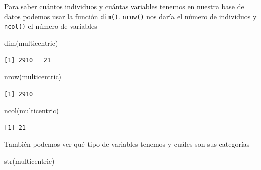 \documentclass[
]{book}
\newenvironment{Shaded}{\begin{snugshade}}{\end{snugshade}}
\newcommand{\FunctionTok}[1]{\textcolor[rgb]{0.00,0.00,0.00}{#1}}
\newcommand{\NormalTok}[1]{#1}
\begin{document}
Para saber cuántos individuos y cuántas variables tenemos en nuestra base de datos podemos usar la función \texttt{dim()}. \texttt{nrow()} nos daría el número de individuos y \texttt{ncol()} el número de variables

\begin{Shaded}
\begin{Highlighting}[]
\FunctionTok{dim}\NormalTok{(multicentric)}
\end{Highlighting}
\end{Shaded}

\begin{verbatim}
[1] 2910   21
\end{verbatim}

\begin{Shaded}
\begin{Highlighting}[]
\FunctionTok{nrow}\NormalTok{(multicentric)}
\end{Highlighting}
\end{Shaded}

\begin{verbatim}
[1] 2910
\end{verbatim}

\begin{Shaded}
\begin{Highlighting}[]
\FunctionTok{ncol}\NormalTok{(multicentric)}
\end{Highlighting}
\end{Shaded}

\begin{verbatim}
[1] 21
\end{verbatim}

También podemos ver qué tipo de variables tenemos y cuáles son sus categorías

\begin{Shaded}
\begin{Highlighting}[]
\FunctionTok{str}\NormalTok{(multicentric)}
\end{Highlighting}
\end{Shaded}
\end{document}
